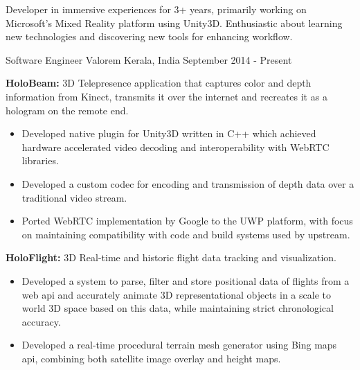 \documentclass[11pt, a4paper]{awesome-cv}
\begin{document}
\makecvheader[C]


\begin{cvparagraph}

	Developer in immersive experiences for 3+ years, primarily working on Microsoft’s Mixed Reality platform using Unity3D. Enthusiastic about learning new technologies and discovering new tools for enhancing workflow.
\end{cvparagraph}


\begin{cventries}
	\cventry
	{Software Engineer} %
	{Valorem} %
	{Kerala, India} %
	{September 2014 - Present} %
	{
		\begin{cvitems} %
			\item \textbf{HoloBeam:} 3D Telepresence application that captures color and depth information from Kinect, transmits it over the internet and recreates it as a hologram on the remote end.
				\begin{itemize} 
					\item Developed native plugin for Unity3D written in C++ which achieved hardware accelerated video decoding and interoperability with WebRTC libraries.
					\item Developed a custom codec for encoding and transmission of depth data over a traditional video stream.
					\item Ported WebRTC implementation by Google to the UWP platform, with focus on maintaining compatibility with code and build systems used by upstream.
				\end{itemize}
			\item \textbf{HoloFlight:} 3D Real-time and historic flight data tracking and visualization.
				\begin{itemize}
					\item Developed a system to parse, filter and store positional data of flights from a web api and accurately animate 3D representational objects in a scale to world 3D space based on this data, while maintaining strict chronological accuracy.
					\item Developed a real-time procedural terrain mesh generator using Bing maps api, combining both satellite image overlay and height maps.
				\end{itemize}
		\end{cvitems}
	}
\end{cventries}
\end{document}
